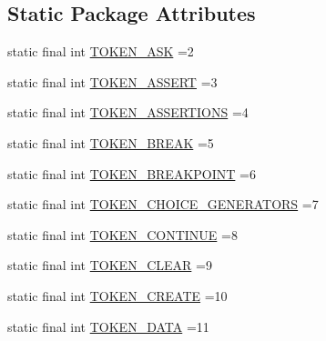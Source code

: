 \subsection*{Static Package Attributes}
\begin{DoxyCompactItemize}
\item 
static final int \hyperlink{classgov_1_1nasa_1_1jpf_1_1inspector_1_1client_1_1parser_1_1_console_grammar_parser_aceaa83591a76f17801362890ec5ace12}{T\+O\+K\+E\+N\+\_\+\+A\+SK} =2
\item 
static final int \hyperlink{classgov_1_1nasa_1_1jpf_1_1inspector_1_1client_1_1parser_1_1_console_grammar_parser_a53439b8a59a0be879a077ffb8bb59107}{T\+O\+K\+E\+N\+\_\+\+A\+S\+S\+E\+RT} =3
\item 
static final int \hyperlink{classgov_1_1nasa_1_1jpf_1_1inspector_1_1client_1_1parser_1_1_console_grammar_parser_a4a9f5da8ded8ec86d64dafbf8e21bb64}{T\+O\+K\+E\+N\+\_\+\+A\+S\+S\+E\+R\+T\+I\+O\+NS} =4
\item 
static final int \hyperlink{classgov_1_1nasa_1_1jpf_1_1inspector_1_1client_1_1parser_1_1_console_grammar_parser_a947dbd1a6bd8826973b25226b63ebb71}{T\+O\+K\+E\+N\+\_\+\+B\+R\+E\+AK} =5
\item 
static final int \hyperlink{classgov_1_1nasa_1_1jpf_1_1inspector_1_1client_1_1parser_1_1_console_grammar_parser_a951264100f5521a2f0081d21d838a3ab}{T\+O\+K\+E\+N\+\_\+\+B\+R\+E\+A\+K\+P\+O\+I\+NT} =6
\item 
static final int \hyperlink{classgov_1_1nasa_1_1jpf_1_1inspector_1_1client_1_1parser_1_1_console_grammar_parser_abc82b513c43997c7369162a20cb4887b}{T\+O\+K\+E\+N\+\_\+\+C\+H\+O\+I\+C\+E\+\_\+\+G\+E\+N\+E\+R\+A\+T\+O\+RS} =7
\item 
static final int \hyperlink{classgov_1_1nasa_1_1jpf_1_1inspector_1_1client_1_1parser_1_1_console_grammar_parser_ade8c11b735ec05d3adeb298fce4b32ef}{T\+O\+K\+E\+N\+\_\+\+C\+O\+N\+T\+I\+N\+UE} =8
\item 
static final int \hyperlink{classgov_1_1nasa_1_1jpf_1_1inspector_1_1client_1_1parser_1_1_console_grammar_parser_a529c6643b2f5224445567be6b25b4b42}{T\+O\+K\+E\+N\+\_\+\+C\+L\+E\+AR} =9
\item 
static final int \hyperlink{classgov_1_1nasa_1_1jpf_1_1inspector_1_1client_1_1parser_1_1_console_grammar_parser_ab8d5c719ffb2faaa69b6c71d936670e3}{T\+O\+K\+E\+N\+\_\+\+C\+R\+E\+A\+TE} =10
\item 
static final int \hyperlink{classgov_1_1nasa_1_1jpf_1_1inspector_1_1client_1_1parser_1_1_console_grammar_parser_ad5ab05ea18182424a91fc1fca4029e33}{T\+O\+K\+E\+N\+\_\+\+D\+A\+TA} =11

\end{DoxyCompactItemize}
